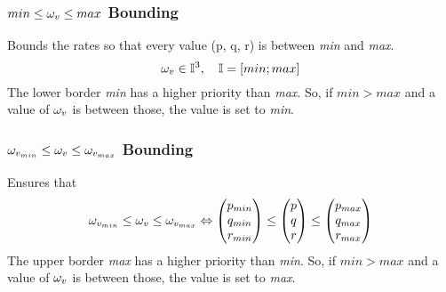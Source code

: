 \subsubsection*{$min \leq \ra v \leq max$ Bounding}
Bounds the rates so that every value (p, q, r) is between \textit{min} and \textit{max}.
\begin{equation}
\ra v \in \mathbb{I}^3, \quad \mathbb{I} = [min; max]
\end{equation}
The lower border \textit{min} has a higher priority than \textit{max}. So, if $ min > max$ and a value of $ \ra v $ is between those, the value is set to \textit{min}. \\

\subsubsection*{$\ra{v_{min}} \leq \ra v \leq \ra{v_{max}}$ Bounding}
Ensures that
\begin{equation}
\ra {v_{min}} \leq \ra v \leq \ra{v_{max}} \Leftrightarrow \begin{pmatrix} p_{min} \\ q_{min} \\ r_{min} \end{pmatrix} \leq \begin{pmatrix} p \\ q \\ r \end{pmatrix} \leq \begin{pmatrix} p_{max} \\ q_{max} \\ r_{max} \end{pmatrix}
\end{equation}
The upper border \textit{max} has a higher priority than \textit{min}. So, if $ min > max$ and a value of $ \ra v $ is between those, the value is set to \textit{max}. \\
